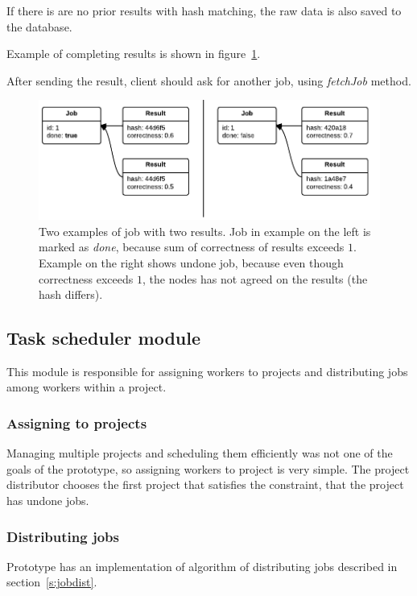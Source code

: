 If there is are no prior results with hash matching, the raw data is also saved to the database.

Example of completing results is shown in figure~\ref{f:sendresultsex}.

After sending the result, client should ask for another job, using \emph{fetchJob} method.

\begin{figure}
\centering
\includegraphics{diagrams/SendResultsExample.pdf}
\caption{Two examples of job with two results. Job in example on the left is marked as \emph{done}, because sum of correctness of results exceeds $1$. Example on the right shows undone job, because even though correctness exceeds $1$, the nodes has not agreed on the results (the hash differs).}
\label{f:sendresultsex}
\end{figure}

\subsection{Task scheduler module}
\label{s:scheduler}

This module is responsible for assigning workers to projects and distributing jobs among workers within a project.

\subsubsection{Assigning to projects}

Managing multiple projects and scheduling them efficiently was not one of the goals of the prototype, so assigning workers to project is very simple. The project distributor chooses the first project that satisfies the constraint, that the project has undone jobs.

\subsubsection{Distributing jobs}

Prototype has an implementation of algorithm of distributing jobs described in section~\ref{s:jobdist}.

